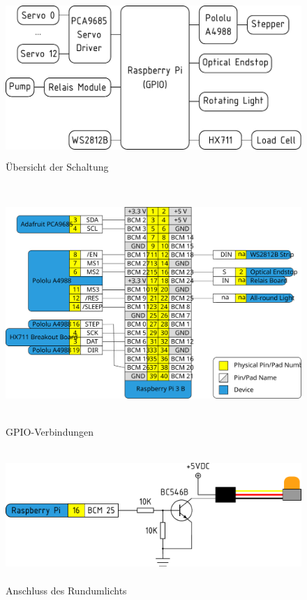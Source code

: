 \documentclass[a4paper]{scrartcl}
\begin{document}
\begin{figure}
  \centering
  \includegraphics[height=6cm]{pics/RPi_GPIO_overview.pdf}
  \caption{Übersicht der Schaltung} \label{GPIO_overview}
\end{figure}

\begin{figure}
  \centering
  \includegraphics[height=9cm]{pics/Hector9000_connections.svg}
  \caption{GPIO-Verbindungen} \label{GPIO_connections}
\end{figure}

\begin{figure}
  \centering
  \includegraphics[height=5cm]{pics/rundumlicht.pdf}
  \caption{Anschluss des Rundumlichts} \label{rundumlicht}
\end{figure}
\end{document}
